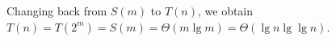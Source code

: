 Changing back from $S(m)$ to $T(n)$, we obtain $T(n)=T(2^m)=S(m)=\Theta(m\lg m)=\Theta(\lg n\lg\lg n)$.
